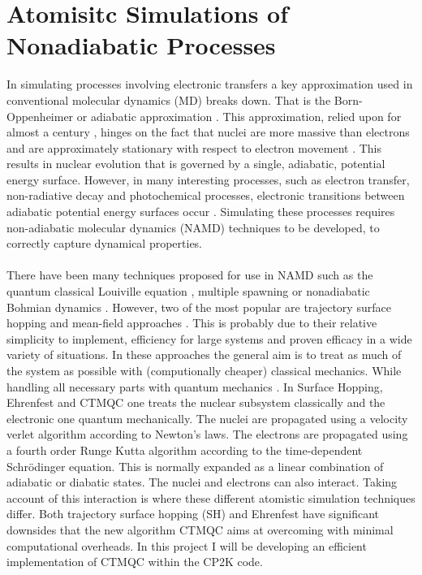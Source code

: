 \section{Atomisitc Simulations of Nonadiabatic Processes}
In simulating processes involving electronic transfers a key approximation used in conventional molecular dynamics (MD) breaks down. That is the Born-Oppenheimer or adiabatic approximation \cite{john_c._tully_nonadiabatic_nodate}. This approximation, relied upon for almost a century \cite{Pisana2007Feb}, hinges on the fact that nuclei are more massive than electrons and are approximately stationary with respect to electron movement \cite{Born1927Jan}. This results in nuclear evolution that is governed by a single, adiabatic, potential energy surface. However, in many interesting processes, such as electron transfer, non-radiative decay and photochemical processes, electronic transitions between adiabatic potential energy surfaces occur \cite{tully_nonadiabatic_1991}. Simulating these processes requires non-adiabatic molecular dynamics (NAMD) techniques to be developed, to correctly capture dynamical properties.
\\\\
There have been many techniques proposed for use in NAMD such as the quantum classical Louiville equation \cite{Kapral1999May}, multiple spawning \cite{Martnnez*2005Oct} or nonadiabatic Bohmian dynamics \cite{Albareda2014Aug}. However, two of the most popular are trajectory surface hopping \cite{Tully1990Jul} and mean-field approaches \cite{Whetten85}. This is probably due to their relative simplicity to implement, efficiency for large systems and proven efficacy in a wide variety of situations. In these approaches the general aim is to treat as much of the system as possible with (computionally cheaper) classical mechanics. While handling all necessary parts with quantum mechanics \cite{Coker1995Jan}. In Surface Hopping, Ehrenfest and CTMQC one treats the nuclear subsystem classically and the electronic one quantum mechanically. The nuclei are propagated using a velocity verlet algorithm according to Newton's laws. The electrons are propagated using a fourth order Runge Kutta algorithm according to the time-dependent Schr\"odinger equation. This is normally expanded as a linear combination of adiabatic or diabatic states. The nuclei and electrons can also interact. Taking account of this interaction is where these different atomistic simulation techniques differ. Both trajectory surface hopping (SH) and Ehrenfest have significant downsides that the new algorithm CTMQC aims at overcoming with minimal computational overheads. In this project I will be developing an efficient implementation of CTMQC within the CP2K code.
\newpage
